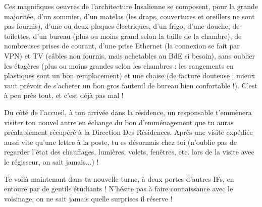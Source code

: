 Ces magnifiques oeuvres de l'architecture Insalienne se composent, pour la
grande majoritée, d'un sommier, d'un matelas (les draps, couvertures et
oreillers ne sont pas fournis), d'une ou deux plaques électriques, d'un frigo,
d'une douche, de toilettes, d'un bureau (plus ou moins grand selon la taille de la
chambre), de nombreuses prises de courant, d'une prise Ethernet (la
connexion se fait par VPN) et TV (câbles non fournis, mais
achetables au BdE si besoin), sans oublier les étagères (plus ou moins grandes
selon les chambres : les rangements en plastiques sont
un bon remplacement) et une chaise (de facture douteuse : mieux vaut prévoir de
s'acheter un bon gros fauteuil de bureau bien confortable !). C'est à peu près tout, et c'est déjà pas mal !

Du côté de l'accueil, à ton arrivée dans la résidence, un responsable t'emmènera visiter ton
nouvel antre en échange du bon d'emménagement que tu auras préalablement
récupéré à la Direction Des Résidences. Après une visite expédiée aussi vite
qu'une lettre à la poste, tu es désormais chez toi (n'oublie pas de regarder
l'état des chauffages, lumières, volets, fenêtres,  etc. lors de la visite
avec le régisseur, on sait jamais...) !

Te voilà maintenant dans ta nouvelle turne, à deux portes d'autres IFs, en entouré par de gentils étudiants !
N'hésite pas à faire connaissance avec le voisinage, on ne sait jamais quelle surprises il réserve !
